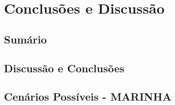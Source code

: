 
\chapter{Conclusões e Discussão} %
\label{chap:Chapter6} %

\section{Sumário}



\section{Discussão e Conclusões}



\section{Cenários Possíveis - MARINHA}
